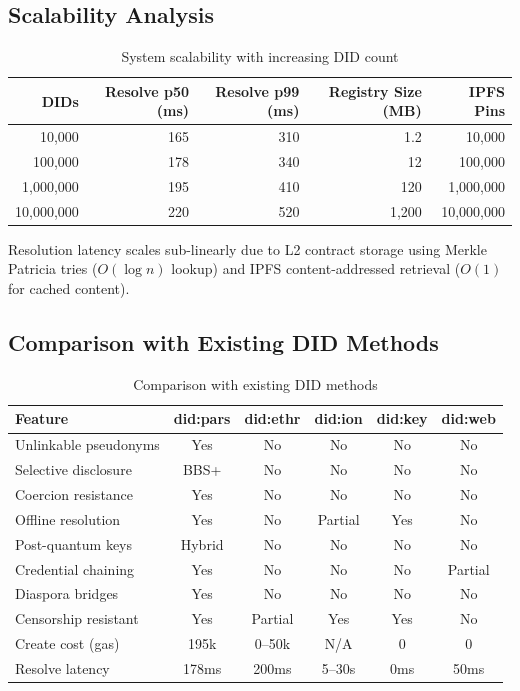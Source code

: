 \documentclass[11pt,a4paper]{article}
\begin{document}
\subsection{Scalability Analysis}

\begin{table}[h]
\centering
\caption{System scalability with increasing DID count}
\label{tab:scalability}
\begin{tabular}{rrrrr}
\toprule
\textbf{DIDs} & \textbf{Resolve p50 (ms)} & \textbf{Resolve p99 (ms)} & \textbf{Registry Size (MB)} & \textbf{IPFS Pins} \\
\midrule
10{,}000 & 165 & 310 & 1.2 & 10{,}000 \\
100{,}000 & 178 & 340 & 12 & 100{,}000 \\
1{,}000{,}000 & 195 & 410 & 120 & 1{,}000{,}000 \\
10{,}000{,}000 & 220 & 520 & 1{,}200 & 10{,}000{,}000 \\
\bottomrule
\end{tabular}
\end{table}

Resolution latency scales sub-linearly due to L2 contract storage using Merkle
Patricia tries ($O(\log n)$ lookup) and IPFS content-addressed retrieval ($O(1)$
for cached content).

\subsection{Comparison with Existing DID Methods}

\begin{table}[h]
\centering
\caption{Comparison with existing DID methods}
\label{tab:comparison}
\begin{tabular}{lccccc}
\toprule
\textbf{Feature} & \textbf{did:pars} & \textbf{did:ethr} & \textbf{did:ion} & \textbf{did:key} & \textbf{did:web} \\
\midrule
Unlinkable pseudonyms & Yes & No & No & No & No \\
Selective disclosure & BBS+ & No & No & No & No \\
Coercion resistance & Yes & No & No & No & No \\
Offline resolution & Yes & No & Partial & Yes & No \\
Post-quantum keys & Hybrid & No & No & No & No \\
Credential chaining & Yes & No & No & No & Partial \\
Diaspora bridges & Yes & No & No & No & No \\
Censorship resistant & Yes & Partial & Yes & Yes & No \\
Create cost (gas) & 195k & 0--50k & N/A & 0 & 0 \\
Resolve latency & 178ms & 200ms & 5--30s & 0ms & 50ms \\
\bottomrule
\end{tabular}
\end{table}
\end{document}
